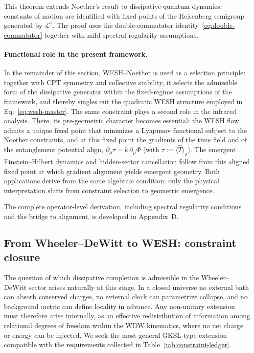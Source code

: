 \documentclass[12pt,a4paper]{article}
\numberwithin{equation}{section}
\begin{document}
\noindent This theorem extends Noether's result to dissipative quantum dynamics:
constants of motion are identified with fixed points of the Heisenberg
semigroup generated by $\mathcal L^\dagger$. The proof uses the 
double-commutator identity~\eqref{eq:double-commutator} together with
mild spectral regularity assumptions.

\paragraph{Functional role in the present framework.}
In the remainder of this section, WESH--Noether is used as a selection 
principle: together with CPT symmetry and collective stability, it selects 
the admissible form of the dissipative generator within the fixed-regime 
assumptions of the framework, and thereby singles out the quadratic WESH 
structure employed in Eq.~\eqref{eq:wesh-master}. The same 
constraint plays a second role in the infrared analysis. There, its 
pre-geometric character becomes essential: the WESH flow admits a unique 
fixed point that minimizes a Lyapunov functional subject to the Noether 
constraints, and at this fixed point the gradients of the time field and of the entanglement potential align, $\partial_\mu\tau = k\,\partial_\mu\Phi$ (with $\tau:=\langle\hat T\rangle_\rho$).
The emergent Einstein--Hilbert dynamics and hidden-sector cancellation 
follow from this aligned fixed point at which gradient alignment yields emergent geometry. Both applications derive from the same algebraic condition; only the 
physical interpretation shifts from constraint selection to geometric 
emergence.

\vspace{0.3cm}

\noindent The complete operator-level derivation, including spectral regularity 
conditions and the bridge to alignment, is developed in Appendix~D.

\vspace{0.8cm}

\subsection{From Wheeler--DeWitt to WESH: constraint closure}
\label{sec:constraint-closure}

\vspace{0.3cm}

The question of which dissipative completion is admissible in the Wheeler--DeWitt sector arises naturally at this stage. In a closed universe no external bath can absorb conserved charges, no external clock can parametrize collapse, and no background metric can define locality in advance. Any non-unitary extension must therefore arise internally, as an effective redistribution of information among relational degrees of freedom within the WDW kinematics, where no net charge or energy can be injected. We seek the most general GKSL-type extension compatible with the requirements collected in Table~\ref{tab:constraint-ledger}.
\end{document}
